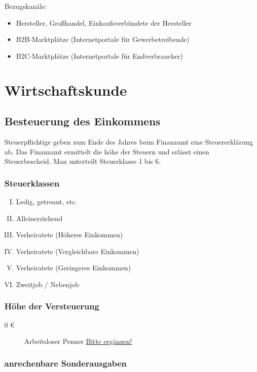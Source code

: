 \documentclass{scrartcl}
\begin{document}
\noindent Bezugskanäle:
\begin{itemize}
	\item Hersteller, Großhandel, Einkaufsverbündete der Hersteller
	\item B2B-Marktplätze (Internetportale für Gewerbetreibende)
	\item B2C-Marktplätze (Internetportale für Endverbraucher)
\end{itemize}

\section{Wirtschaftskunde}
\subsection{Besteuerung des Einkommens}

Steuerpflichtige geben zum Ende des Jahres beim Finanzamt eine Steuererklärung ab.
Das Finanzamt ermittelt die höhe der Steuern und erlässt einen Steuerbescheid.
Man unterteilt Steuerklasse 1 bis 6.

\subsubsection{Steuerklassen}

\begin{enumerate}[I.]
	\item Ledig, getrennt, etc.
	\item Alleinerziehend
	\item Verheiratete (Höheres Einkommen)
	\item Verheiratete (Vergleichbare Einkommen)
	\item Verheiratete (Geringeres Einkommen)
	\item Zweitjob / Nebenjob
\end{enumerate}

\subsubsection{Höhe der Versteuerung}

\begin{description}
	\item [0 \euro] Arbeitsloser Penner \underline{Bitte ergänzen!}
\end{description}

\subsubsection{anrechenbare Sonderausgaben}
\end{document}
